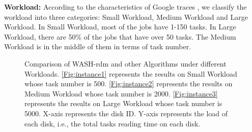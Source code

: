 \documentclass[conference]{IEEEtran}
\begin{document}
\textbf{Workload:} According to the characteristics of Google traces \cite{b20}, we classify the workload into three categories: Small Workload, Medium Workload and Large Workload. In Small Workload, most of the jobs have 1-150 tasks. In Large Workload, there are 50\% of the jobs that have over 50 tasks. The Medium Workload is in the middle of them in terms of task number.
\begin{figure}[!t]
	\centering
	\quad\quad %
	\quad\quad
	\vspace{-1ex}
	\caption{Comparison of WASH-rdm and other Algorithms under different Workloads. \ref{Fig:instance1} represents the results on Small Workload whose task number is 500. \ref{Fig:instance2} represents the results on Medium Workload whose task number is 2000.
	\ref{Fig:instance3} represents the results on Large Workload whose task number is 5000. X-axis represents the disk ID. Y-axis represents the load of each disk, i.e., the total tasks reading time on each disk.}
	\label{Fig:instance}
	\vspace{-1ex}
\end{figure}
\end{document}

